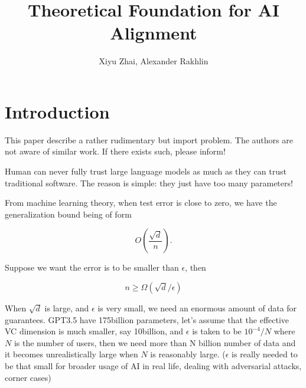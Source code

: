 \documentclass[11pt, oneside]{article}   	%
\title{Theoretical Foundation for AI Alignment}
\author{Xiyu Zhai, Alexander Rakhlin}
\date{}							%
\theoremstyle{definition}
\begin{document}
\maketitle
\tableofcontents


\section{Introduction}

This paper describe a rather rudimentary but import problem. The authors are not aware of similar work. If there exists such, please inform!

Human can never fully trust large language models as much as they can trust traditional software. The reason is simple: they just have too many parameters!

From machine learning theory, when test error is close to zero, we have the generalization bound being of form

\begin{equation}
	O\left(\frac{\sqrt{d}}{n}\right).
\end{equation}

Suppose we want the error is to be smaller than $\epsilon$, then

\begin{equation}
	n\ge \Omega(\sqrt{d}/\epsilon)
\end{equation}

When $\sqrt{d}$ is large, and $\epsilon$ is very small, we need an enormous amount of data for guarantees. GPT3.5 have 175billion parameters, let's assume that the effective VC dimension is much smaller, say 10billion, and $\epsilon$ is taken to be $10^{-4}/N$ where $N$ is the number of users, then we need more than N billion number of data and it becomes unrealistically large when $N$ is reasonably large. ($\epsilon$ is really needed to be that small for broader usage of AI in real life, dealing with adversarial attacks, corner cases)
\end{document}
